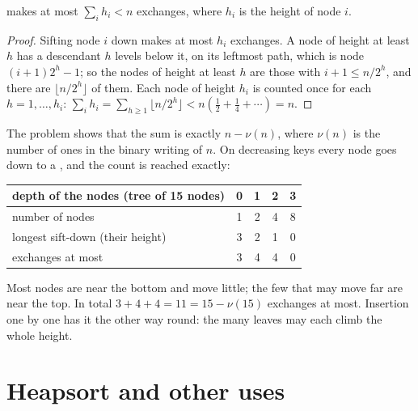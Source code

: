 \begin{proposition}\label{prop:b1:heaps:build}
 makes at most $\sum_i h_i < n$ exchanges, where $h_i$ is the height of node $i$.
\end{proposition}

\begin{proof}
Sifting node $i$ down makes at most $h_i$ exchanges. A node of height at least $h$ has a descendant $h$ levels below it,
on its leftmost path, which is node $(i + 1)2^h - 1$; so the nodes of height at least $h$ are those with $i + 1 \leq
n/2^h$, and there are $\lfloor n/2^h \rfloor$ of them. Each node of height $h_i$ is counted once for each $h = 1, \dots,
h_i$: $\sum_i h_i = \sum_{h \geq 1} \lfloor n/2^h \rfloor < n(\frac12 + \frac14 + \cdots) = n$.
\end{proof}

The problem shows that the sum is exactly $n - \nu(n)$, where $\nu(n)$ is the number of ones in the binary writing of
$n$. On decreasing keys every node goes down to a , and the count is reached exactly:

\label{out:b1:heaps:build}

\begin{center}\small
\begin{tabular}{lcccc}
\hline
depth of the nodes (tree of 15 nodes) & 0 & 1 & 2 & 3 \\
\hline
number of nodes & 1 & 2 & 4 & 8 \\
longest sift-down (their height) & 3 & 2 & 1 & 0 \\
exchanges at most & 3 & 4 & 4 & 0 \\
\hline
\end{tabular}
\end{center}

\noindent Most nodes are near the bottom and move little; the few that may move far are near the top. In total $3 + 4 +
4 = 11 = 15 - \nu(15)$ exchanges at most. Insertion one by one has it the other way round: the many leaves may each climb
the whole height.

\section{Heapsort and other uses}\label{sec:b1:heaps:uses}


